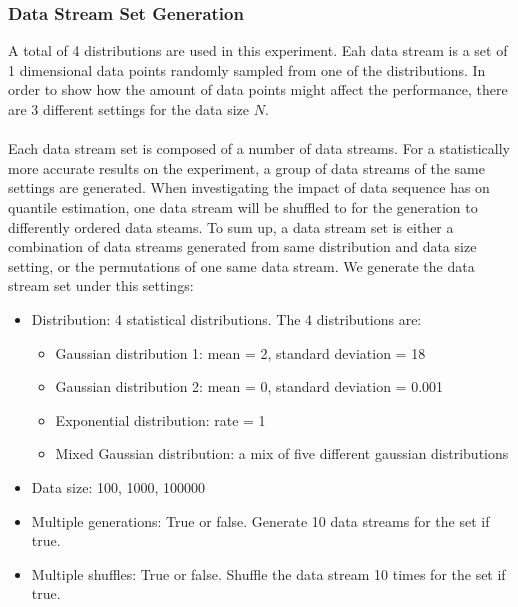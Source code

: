 \documentclass[12pt]{article}
\begin{document}
\subsubsection{Data Stream Set Generation}
A total of 4 distributions are used in this experiment.
Eah data stream is a set of 1 dimensional data points randomly sampled from one of the distributions. In order to show how the amount of data points might affect the performance, there are 3 different settings for the data size $N$. 
\\\\
Each data stream set is composed of a number of data streams. For a statistically more accurate results on the experiment, a group of data streams of the same settings are generated. When investigating the impact of data sequence has on quantile estimation, one data stream will be shuffled to for the generation to differently ordered data steams. To sum up, a data stream set is either a combination of data streams generated from same distribution and data size setting, or the permutations of one same data stream. We generate the data stream set under this settings:

\begin{itemize}
    \item Distribution: 4 statistical distributions. The 4 distributions are:
        \begin{itemize}
            \item Gaussian distribution 1: mean = 2, standard deviation = 18
            \item Gaussian distribution 2: mean = 0, standard deviation = 0.001
            \item Exponential distribution: rate = 1
            \item Mixed Gaussian distribution: a mix of five different gaussian distributions
        \end{itemize}
    \item Data size: 100, 1000, 100000
    \item Multiple generations: True or false. Generate 10 data streams for the set if true.
    \item Multiple shuffles:  True or false. Shuffle the data stream 10 times for the set if true.
\end{itemize}
\end{document}
